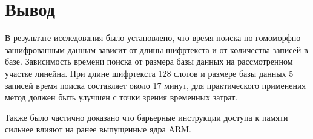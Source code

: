 \section{Вывод}

В результате исследования было установлено, что время поиска по
гомоморфно зашифрованным данным зависит от длины шифртекста и от
количества записей в базе. Зависимость времени поиска от размера базы
данных на рассмотренном участке линейна. При длине шифртекста 128 слотов
и размере базы данных 5 записей время поиска составляет около 17 минут,
для практического применения метод должен быть улучшен с точки зрения
временных затрат.

Также было частично доказано что барьерные инструкции доступа к памяти сильнее влияют на ранее выпущенные ядра ARM.